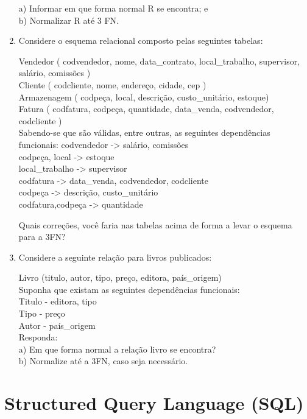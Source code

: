 \documentclass[11pt]{article}
\begin{document}
\begin{enumerate}
		a) Informar em que forma normal R se encontra; e\\
		b) Normalizar R até 3 FN.
		
		\item Considere o esquema relacional composto pelas seguintes tabelas:
		
		Vendedor ( codvendedor, nome, data\_contrato, local\_trabalho, supervisor, salário, comissões )\\
		Cliente ( codcliente, nome, endereço, cidade, cep )\\
		Armazenagem ( codpeça, local, descrição, custo\_unitário, estoque)\\
		Fatura ( codfatura, codpeça, quantidade, data\_venda, codvendedor, codcliente )\\
		
		Sabendo-se que são válidas, entre outras, as seguintes dependências funcionais:
		codvendedor -> salário, comissões\\
		codpeça, local -> estoque\\
		local\_trabalho -> supervisor\\
		codfatura -> data\_venda, codvendedor, codcliente\\
		codpeça -> descrição, custo\_unitário\\
		codfatura,codpeça -> quantidade 
		
		Quais correções, você faria nas tabelas acima de forma a levar o esquema para a 3FN?
		
		\item Considere a seguinte relação para livros publicados:
		
		Livro (titulo, autor, tipo, preço, editora, país\_origem)\\
		Suponha que existam as seguintes dependências funcionais:\\
		Titulo - editora, tipo\\
		Tipo - preço\\
		Autor - país\_origem\\
		
		Responda:\\
		a) Em que forma normal a relação livro se encontra?\\
		b) Normalize até a 3FN, caso seja necessário.  
	\end{enumerate}
	
	\newpage
	
	\section{Structured Query Language (SQL)}
	
\end{document}
